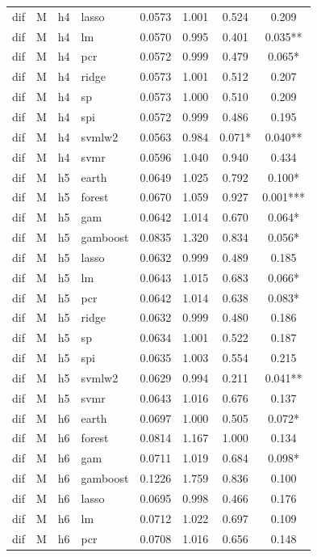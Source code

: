 \begin{ThreePartTable}
\begin{longtable}[t]{llclcccc}
dif & M & h4 & lasso & 0.0573 & 1.001 & 0.524 & 0.209\\
dif & M & h4 & lm & 0.0570 & 0.995 & 0.401 & 0.035**\\
dif & M & h4 & pcr & 0.0572 & 0.999 & 0.479 & 0.065*\\
dif & M & h4 & ridge & 0.0573 & 1.001 & 0.512 & 0.207\\
dif & M & h4 & sp & 0.0573 & 1.000 & 0.510 & 0.209\\
dif & M & h4 & spi & 0.0572 & 0.999 & 0.486 & 0.195\\
dif & M & h4 & svmlw2 & 0.0563 & 0.984 & 0.071* & 0.040**\\
dif & M & h4 & svmr & 0.0596 & 1.040 & 0.940 & 0.434\\
\addlinespace
dif & M & h5 & earth & 0.0649 & 1.025 & 0.792 & 0.100*\\
dif & M & h5 & forest & 0.0670 & 1.059 & 0.927 & 0.001***\\
dif & M & h5 & gam & 0.0642 & 1.014 & 0.670 & 0.064*\\
dif & M & h5 & gamboost & 0.0835 & 1.320 & 0.834 & 0.056*\\
dif & M & h5 & lasso & 0.0632 & 0.999 & 0.489 & 0.185\\
dif & M & h5 & lm & 0.0643 & 1.015 & 0.683 & 0.066*\\
dif & M & h5 & pcr & 0.0642 & 1.014 & 0.638 & 0.083*\\
dif & M & h5 & ridge & 0.0632 & 0.999 & 0.480 & 0.186\\
dif & M & h5 & sp & 0.0634 & 1.001 & 0.522 & 0.187\\
dif & M & h5 & spi & 0.0635 & 1.003 & 0.554 & 0.215\\
dif & M & h5 & svmlw2 & 0.0629 & 0.994 & 0.211 & 0.041**\\
dif & M & h5 & svmr & 0.0643 & 1.016 & 0.676 & 0.137\\
\addlinespace
dif & M & h6 & earth & 0.0697 & 1.000 & 0.505 & 0.072*\\
dif & M & h6 & forest & 0.0814 & 1.167 & 1.000 & 0.134\\
dif & M & h6 & gam & 0.0711 & 1.019 & 0.684 & 0.098*\\
dif & M & h6 & gamboost & 0.1226 & 1.759 & 0.836 & 0.100\\
dif & M & h6 & lasso & 0.0695 & 0.998 & 0.466 & 0.176\\
dif & M & h6 & lm & 0.0712 & 1.022 & 0.697 & 0.109\\
dif & M & h6 & pcr & 0.0708 & 1.016 & 0.656 & 0.148\\

\end{longtable}
\end{ThreePartTable}
